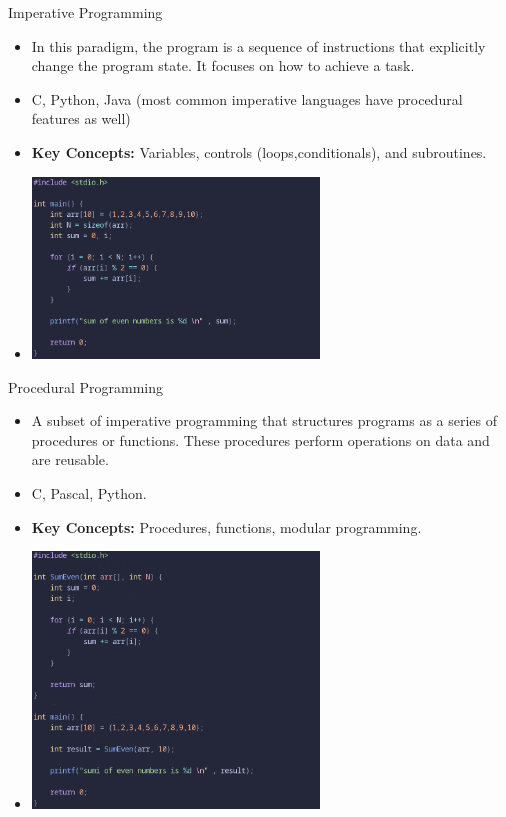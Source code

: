 \documentclass{beamer}
\begin{document}
\begin{frame}[t]{Imperative Programming}
	\scriptsize
	\begin{itemize}
		\item<1-> In this paradigm, the program is a sequence of instructions that explicitly change the program state. It focuses on how to achieve a task.
		\item<2-> C, Python, Java (most common imperative languages have procedural features as well)
		\item<3-> \textbf{Key Concepts:} Variables, controls (loops,conditionals), and subroutines.
		\item<4->[]
			\begin{center}
				\includegraphics[width=0.6\textwidth, height=0.5\textheight]{img/c-example.png}
			\end{center}
	\end{itemize}
\end{frame}


\begin{frame}{Procedural Programming}
	\scriptsize
	\begin{itemize}
		\item<1-> A subset of imperative programming that structures programs as a series of procedures or functions. These procedures perform operations on data and are reusable.
		\item<2-> C, Pascal, Python.
		\item<3-> \textbf{Key Concepts:} Procedures, functions, modular programming.
		\item<4->[]
			\begin{center}
				\includegraphics[width=0.6\textwidth, height=0.5\textheight]{img/c-even-sum.png}
			\end{center}
	\end{itemize}
\end{frame}
\end{document}
